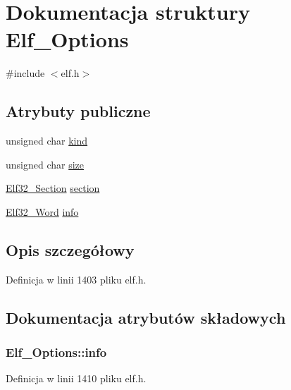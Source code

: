 \hypertarget{struct_elf___options}{\section{Dokumentacja struktury Elf\-\_\-\-Options}
\label{struct_elf___options}
}


{\ttfamily \#include $<$elf.\-h$>$}

\subsection*{Atrybuty publiczne}
\begin{DoxyCompactItemize}
\item 
unsigned char \hyperlink{struct_elf___options_a3732e1185baf21c513ee7618d334d8c5}{kind}
\item 
unsigned char \hyperlink{struct_elf___options_a9a66f1e3a53f76858d3520f151864744}{size}
\item 
\hyperlink{elf_8h_abaffe34cd8a7e31c8f57ebf85c17ca34}{Elf32\-\_\-\-Section} \hyperlink{struct_elf___options_a87449701f0810aa950517897da8ad747}{section}
\item 
\hyperlink{elf_8h_af5924ece606c732e86f8263a19408e45}{Elf32\-\_\-\-Word} \hyperlink{struct_elf___options_a4d25edb0432aa63eda00cb607ae389eb}{info}
\end{DoxyCompactItemize}


\subsection{Opis szczegółowy}


Definicja w linii 1403 pliku elf.\-h.



\subsection{Dokumentacja atrybutów składowych}
\hypertarget{struct_elf___options_a4d25edb0432aa63eda00cb607ae389eb}{
\subsubsection[{info}]{ Elf\-\_\-\-Options\-::info}}\label{struct_elf___options_a4d25edb0432aa63eda00cb607ae389eb}


Definicja w linii 1410 pliku elf.\-h.


